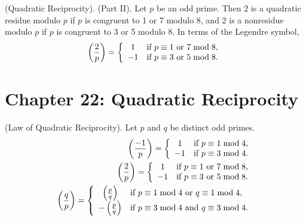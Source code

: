 \documentclass[graybox]{svmult}
\begin{document}
\begin{svgraybox}
\begin{theorem}
(Quadratic Reciprocity). (Part II). Let $p$ be an odd prime. Then 2 is a quadratic residue modulo $p$ if $p$ is congruent to 1 or 7 modulo 8, and 2 is a nonresidue modulo $p$ if $p$ is congruent to 3 or 5 modulo 8. In terms of the Legendre symbol,
\begin{align*}
\left(\frac{2}{p}\right) = \left\{
\begin{array}{c l}
    1 & \text{if } p \equiv 1 \text{ or } 7 \bmod 8, \\
    -1 & \text{if } p \equiv 3 \text{ or } 5 \bmod 8.
\end{array}\right.
\end{align*}
\end{theorem}
\end{svgraybox}

\section*{Chapter 22: Quadratic Reciprocity}

\begin{svgraybox}
\begin{theorem}
(Law of Quadratic Reciprocity). Let $p$ and $q$ be distinct odd primes.
\begin{align*}
\left(\frac{-1}{p}\right) = \left\{
\begin{array}{c l}
    1 & \text{if } p \equiv 1 \bmod 4, \\
    -1 & \text{if } p \equiv 3 \bmod 4.
\end{array}\right. \\
\left(\frac{2}{p}\right) = \left\{
\begin{array}{c l}
    1 & \text{if } p \equiv 1 \text{ or } 7 \bmod 8, \\
    -1 & \text{if } p \equiv 3 \text{ or } 5 \bmod 8.
\end{array}\right. \\
\left(\frac{q}{p}\right) = \left\{
\begin{array}{c l}
    \left(\frac{p}{q}\right) & \text{if } p \equiv 1 \bmod 4 \text{ or } q \equiv 1 \bmod 4, \\
    -\left(\frac{p}{q}\right) & \text{if } p \equiv 3 \bmod 4 \text{ and } q \equiv 3 \bmod 4.
\end{array}\right.
\end{align*}
\end{theorem}
\end{svgraybox}
\end{document}

